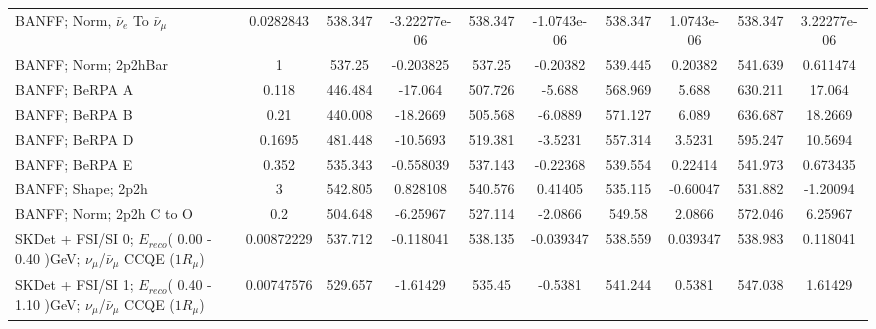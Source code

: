 \documentclass{standalone}
\begin{document}
\begin{tabular}{| l | S | S  S | S  S | S  S | S  S | }
                               BANFF; Norm, $\bar{\nu}_{e}$ To $\bar{\nu}_{\mu}$ &       0.0282843 &         538.347 &    -3.22277e-06 &         538.347 &     -1.0743e-06 &         538.347 &      1.0743e-06 &         538.347 &     3.22277e-06 \\ 
                                                            BANFF; Norm; 2p2hBar &               1 &          537.25 &       -0.203825 &          537.25 &        -0.20382 &         539.445 &         0.20382 &         541.639 &        0.611474 \\ 
                                                                  BANFF; BeRPA A &           0.118 &         446.484 &         -17.064 &         507.726 &          -5.688 &         568.969 &           5.688 &         630.211 &          17.064 \\ 
                                                                  BANFF; BeRPA B &            0.21 &         440.008 &        -18.2669 &         505.568 &         -6.0889 &         571.127 &           6.089 &         636.687 &         18.2669 \\ 
                                                                  BANFF; BeRPA D &          0.1695 &         481.448 &        -10.5693 &         519.381 &         -3.5231 &         557.314 &          3.5231 &         595.247 &         10.5694 \\ 
                                                                  BANFF; BeRPA E &           0.352 &         535.343 &       -0.558039 &         537.143 &        -0.22368 &         539.554 &         0.22414 &         541.973 &        0.673435 \\ 
                                                              BANFF; Shape; 2p2h &               3 &         542.805 &        0.828108 &         540.576 &         0.41405 &         535.115 &        -0.60047 &         531.882 &        -1.20094 \\ 
                                                        BANFF; Norm; 2p2h C to O &             0.2 &         504.648 &        -6.25967 &         527.114 &         -2.0866 &          549.58 &          2.0866 &         572.046 &         6.25967 \\ 
SKDet + FSI/SI  0; $E_{reco}$( 0.00 - 0.40 )GeV; $\nu_{\mu}$/$\bar{\nu}_{\mu}$ CCQE ($1R_{\mu}$) &      0.00872229 &         537.712 &       -0.118041 &         538.135 &       -0.039347 &         538.559 &        0.039347 &         538.983 &        0.118041 \\ 
SKDet + FSI/SI  1; $E_{reco}$( 0.40 - 1.10 )GeV; $\nu_{\mu}$/$\bar{\nu}_{\mu}$ CCQE ($1R_{\mu}$) &      0.00747576 &         529.657 &        -1.61429 &          535.45 &         -0.5381 &         541.244 &          0.5381 &         547.038 &         1.61429 \\ 

\end{tabular}
\end{document}
